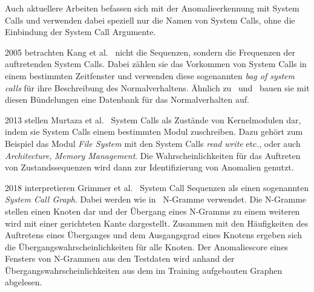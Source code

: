                 Auch aktuellere Arbeiten befassen sich mit der Anomalieerkennung mit System Calls und verwenden dabei speziell nur die Namen von System Calls, ohne die Einbindung der System Call Argumente.\par\medskip
            
                2005 betrachten Kang et al.~\cite{FREQUENCY2} nicht die Sequenzen, sondern die Frequenzen der auftretenden System Calls.
                Dabei zählen sie das Vorkommen von System Calls in einem bestimmten Zeitfenster und verwenden diese sogenannten \textit{bag of system calls} für ihre Beschreibung des Normalverhaltens.
                Ähnlich zu~\cite{FORREST} und~\cite{STIDE} bauen sie mit diesen Bündelungen eine Datenbank für das Normalverhalten auf.\par\medskip

                2013 stellen Murtaza et al.~\cite{SYSTEM_STATES} System Calls als Zustände von Kernelmodulen dar, indem sie System Calls einem bestimmten Modul zuschreiben.
                Dazu gehört zum Beispiel das Modul \textit{File System} mit den System Calls \textit{read} \textit{write} etc., oder auch \textit{Architecture}, \textit{Memory Management}.
                Die Wahrscheinlichkeiten für das Auftreten von Zustandssequenzen wird dann zur Identifizierung von Anomalien genutzt.\par\medskip

                2018 interpretieren Grimmer et al.~\cite{SYSCALL_GRAPHS} System Call Sequenzen als einen sogenannten \textit{System Call Graph}.
                Dabei werden wie in~\cite{STIDE_Alternatives} N-Gramme verwendet.
                Die N-Gramme stellen einen Knoten dar und der Übergang eines N-Gramms zu einem weiteren wird mit einer gerichteten Kante dargestellt.
                Zusammen mit den Häufigkeiten des Auftretens eines Überganges und dem Ausgangsgrad eines Knotens ergeben sich die Übergangswahrscheinlichkeiten für alle Knoten.
                Der Anomaliescore eines Fensters von N-Grammen aus den Testdaten wird anhand der Übergangswahrscheinlichkeiten aus dem im Training aufgebauten Graphen abgelesen.\par\medskip


